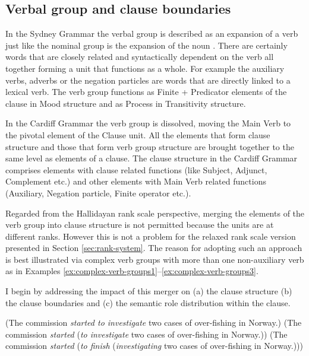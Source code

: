 \subsection{Verbal group and clause boundaries}
\label{sec:verbal-grpoup-and-clause-division}
In the Sydney Grammar the verbal group is described as an expansion of a verb just like the nominal group is the expansion of the noun \citep[396]{Halliday2013}. There are certainly words that are closely related and syntactically dependent on the verb all together forming a unit that functions as a whole. For example the auxiliary verbs, adverbs or the negation particles are words that are directly linked to a lexical verb. The verb group functions as Finite + Predicator elements of the clause in Mood structure and as Process in Transitivity structure. 

In the Cardiff Grammar the verb group is dissolved, moving the Main Verb to the pivotal element of the Clause unit. All the elements that form clause structure and those that form verb group structure are brought together to the same level as elements of a clause. The clause structure in the Cardiff Grammar comprises elements with clause related functions (like Subject, Adjunct, Complement etc.) and other elements with Main Verb related functions (Auxiliary, Negation particle, Finite operator etc.).

Regarded from the Hallidayan rank scale perspective, merging the elements of the verb group into clause structure is not permitted because the units are at different ranks. However this is not a problem for the relaxed rank scale version presented in Section \ref{sec:rank-system}. The reason for adopting such an approach is best illustrated via complex verb groups with more than one non-auxiliary verb as in Examples \ref{ex:complex-verb-groups1}--\ref{ex:complex-verb-groups3}. 

I begin by addressing the impact of this merger on (a) the clause structure (b) the clause boundaries and (c) the semantic role distribution within the clause.

\begin{exe}
	\ex\label{ex:complex-verb-groups1}
	(The commission \textit{started to investigate} two cases of over-fishing in Norway.)  
	\ex\label{ex:complex-verb-groups2}
	(The commission \textit{started} (\textit{to investigate} two cases of over-fishing in Norway.))
	\ex\label{ex:complex-verb-groups3}
	(The commission \textit{started} (\textit{to finish} (\textit{investigating} two cases of over-fishing in Norway.)))
\end{exe}

